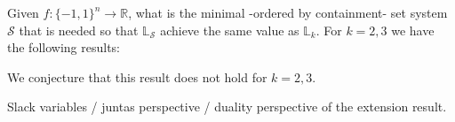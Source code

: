 

Given $f : \{-1,1\}^n \rightarrow \mathbb{R}$, what is the minimal -ordered by containment- set system $\mathcal{S}$ that is needed so that $\mathbb{L}_{\mathcal{S}}$ achieve the same value as $\mathbb{L}_k$. For $k=2, 3$ we have the following results:

\begin{theorem}

\end{theorem}


We conjecture that this result does not hold for $k=2,3$. 


Slack variables / juntas perspective / duality perspective of the extension result. 

